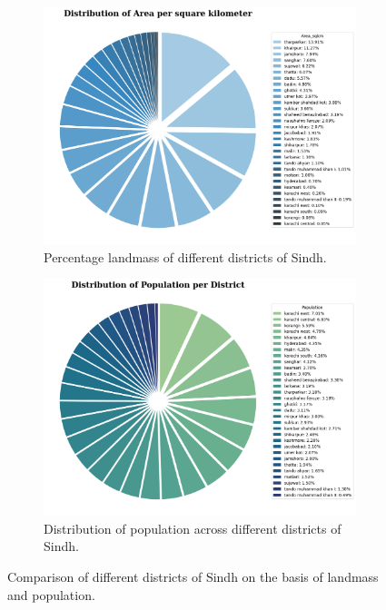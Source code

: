 \documentclass{article}
\begin{document}
\begin{figure}[H]
    \centering
    \begin{subfigure}[b]{0.45\textwidth}
        \centering
        \includegraphics[width=\textwidth]{../Figures/Figure04.png}
        \caption{Percentage landmass of different districts of Sindh.}
        \label{fig:fig4a}
    \end{subfigure}
    \hfill
    \begin{subfigure}[b]{0.45\textwidth}
        \centering
        \includegraphics[width=\textwidth]{../Figures/Figure05.png}
        \caption{Distribution of population across different districts of Sindh.}
        \label{fig:fig4b}
    \end{subfigure}
    \caption{Comparison of different districts of Sindh on the basis of landmass and population.}
    \label{fig:fig4}
\end{figure}
\end{document}
